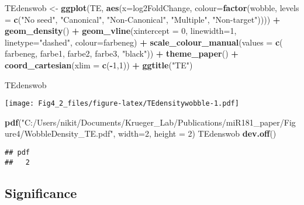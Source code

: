 \documentclass[
]{article}
\newenvironment{Shaded}{\begin{snugshade}}{\end{snugshade}}
\newcommand{\AttributeTok}[1]{\textcolor[rgb]{0.13,0.29,0.53}{#1}}
\newcommand{\DecValTok}[1]{\textcolor[rgb]{0.00,0.00,0.81}{#1}}
\newcommand{\FunctionTok}[1]{\textcolor[rgb]{0.13,0.29,0.53}{\textbf{#1}}}
\newcommand{\NormalTok}[1]{#1}
\newcommand{\OtherTok}[1]{\textcolor[rgb]{0.56,0.35,0.01}{#1}}
\newcommand{\SpecialCharTok}[1]{\textcolor[rgb]{0.81,0.36,0.00}{\textbf{#1}}}
\newcommand{\StringTok}[1]{\textcolor[rgb]{0.31,0.60,0.02}{#1}}
\begin{document}
\begin{Shaded}
\begin{Highlighting}[]
\NormalTok{TEdenswob }\OtherTok{\textless{}{-}} \FunctionTok{ggplot}\NormalTok{(TE, }\FunctionTok{aes}\NormalTok{(}\AttributeTok{x=}\NormalTok{log2FoldChange, }\AttributeTok{colour=}\FunctionTok{factor}\NormalTok{(wobble, }\AttributeTok{levels =} \FunctionTok{c}\NormalTok{(}\StringTok{"No seed"}\NormalTok{, }\StringTok{"Canonical"}\NormalTok{, }\StringTok{"Non{-}Canonical"}\NormalTok{, }\StringTok{"Multiple"}\NormalTok{, }\StringTok{"Non{-}target"}\NormalTok{)))) }\SpecialCharTok{+}
  \FunctionTok{geom\_density}\NormalTok{() }\SpecialCharTok{+}
  \FunctionTok{geom\_vline}\NormalTok{(}\AttributeTok{xintercept =} \DecValTok{0}\NormalTok{, }\AttributeTok{linewidth=}\DecValTok{1}\NormalTok{, }\AttributeTok{linetype=}\StringTok{"dashed"}\NormalTok{, }\AttributeTok{colour=}\NormalTok{farbeneg) }\SpecialCharTok{+}
  \FunctionTok{scale\_colour\_manual}\NormalTok{(}\AttributeTok{values =} \FunctionTok{c}\NormalTok{( farbeneg, farbe1, farbe2, farbe3, }\StringTok{"black"}\NormalTok{)) }\SpecialCharTok{+}
  \FunctionTok{theme\_paper}\NormalTok{() }\SpecialCharTok{+}
  \FunctionTok{coord\_cartesian}\NormalTok{(}\AttributeTok{xlim =} \FunctionTok{c}\NormalTok{(}\SpecialCharTok{{-}}\DecValTok{1}\NormalTok{,}\DecValTok{1}\NormalTok{)) }\SpecialCharTok{+}
  \FunctionTok{ggtitle}\NormalTok{(}\StringTok{"TE"}\NormalTok{)}

\NormalTok{TEdenswob}
\end{Highlighting}
\end{Shaded}

\texttt{[image: Fig4\_2\_files/figure-latex/TEdensitywobble-1.pdf]}

\begin{Shaded}
\begin{Highlighting}[]
\FunctionTok{pdf}\NormalTok{(}\StringTok{"C:/Users/nikit/Documents/Krueger\_Lab/Publications/miR181\_paper/Figure4/WobbleDensity\_TE.pdf"}\NormalTok{, }\AttributeTok{width=}\DecValTok{2}\NormalTok{, }\AttributeTok{height =} \DecValTok{2}\NormalTok{)}
\NormalTok{TEdenswob}
\FunctionTok{dev.off}\NormalTok{()}
\end{Highlighting}
\end{Shaded}

\begin{verbatim}
## pdf 
##   2
\end{verbatim}

\hypertarget{significance}{%
\subsection{Significance}\label{significance}}
\end{document}

